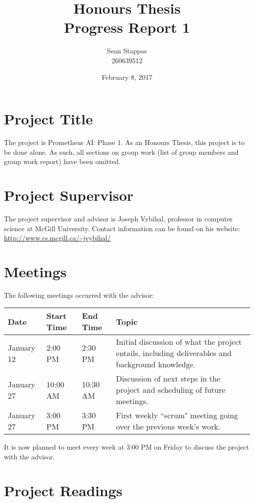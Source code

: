 \documentclass[]{article}
\title{\textbf{Honours Thesis \\ Progress Report 1}}
\author{Sean Stappas \\ 260639512}
\date{February 8, 2017}
\begin{document}
\maketitle

\section{Project Title}

The project is Prometheus AI: Phase 1. As an Honours Thesis, this project is to be done alone. As such, all sections on group work (list of group members and group work report) have been omitted.

\section{Project Supervisor}

The project supervisor and advisor is Joseph Vybihal, professor in computer science at McGill University. Contact information can be found on his website: \url{http://www.cs.mcgill.ca/~jvybihal/}

\section{Meetings}

The following meetings occurred with the advisor:

\begin{center}
	\begin{tabular}{l l l p{10cm}}
		\hline
		Date & Start Time & End Time & Topic \\ \hline
		January 12 & 2:00 PM & 2:30 PM & Initial discussion of what the project entails, including
		deliverables and background knowledge.  \\ \hline
		January 27 & 10:00 AM & 10:30 AM & Discussion of next steps in the project and scheduling of 
		future meetings.\\ \hline
		January 27 & 3:00 PM & 3:30 PM & First weekly ``scrum" meeting going over the previous week's work.  \\
		\hline
	\end{tabular}
\end{center}

It is now planned to meet every week at 3:00 PM on Friday to discuss the project with the advisor.

\section{Project Readings}
\end{document}
